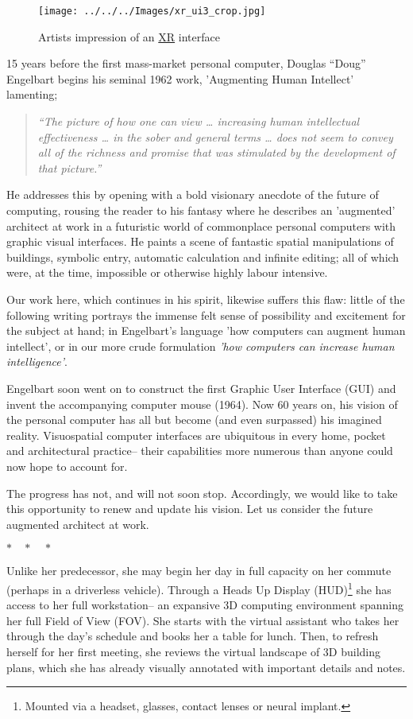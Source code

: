 \documentclass[logo,bsc,singlespacing,parskip]{infthesis}
\newcommand{\threestars}{\begin{center}$ {\ast}\quad{\ast}\quad{\ast} $\end{center}}
\begin{document}
\begin{figure}[h]
\centering
\texttt{[image: ../../../Images/xr\_ui3\_crop.jpg]}
\caption{Artists impression of an \hyperref[org39cbd51]{XR} interface}
\end{figure}

15 years before the first mass-market personal computer, Douglas ``Doug'' Engelbart begins his seminal 1962 work, 'Augmenting Human Intellect' \autocite{engelbartAugmentingHumanIntellect1962} lamenting;

\begin{quote}
\emph{``The picture of how one can view \ldots{} increasing human intellectual effectiveness \ldots{} in the sober and general terms \ldots{} does not seem to convey all of the richness and promise that was stimulated by the development of that picture.''}
\end{quote}

He addresses this by opening with a bold visionary anecdote of the future of computing, rousing the reader to his fantasy where he describes an 'augmented' architect at work in a futuristic world of commonplace personal computers with graphic visual interfaces.
He paints a scene of fantastic spatial manipulations of buildings, symbolic entry, automatic calculation and infinite editing; all of which were, at the time, impossible or otherwise highly labour intensive.

Our work here, which continues in his spirit, likewise suffers this flaw: little of the following writing portrays the immense felt sense of possibility and excitement for the subject at hand; in Engelbart's language 'how computers can augment human intellect', or in our more crude formulation \emph{'how computers can increase human intelligence'}.

Engelbart soon went on to construct the first Graphic User Interface (GUI) and invent the accompanying computer mouse (1964).
Now 60 years on, his vision of the personal computer has all but become (and even surpassed) his imagined reality.
Visuospatial computer interfaces are ubiquitous in every home, pocket and architectural practice-- their capabilities more numerous than anyone could now hope to account for.

The progress has not, and will not soon stop.
Accordingly, we would like to take this opportunity to renew and update his vision.
Let us consider the future augmented architect at work.
\threestars

Unlike her predecessor, she may begin her day in full capacity on her commute (perhaps in a driverless vehicle).
Through a Heads Up Display (HUD)\footnote{Mounted via a headset, glasses, contact lenses or neural implant.} she has access to her full workstation-- an expansive 3D computing environment spanning her full Field of View (FOV).
She starts with the virtual assistant who takes her through the day's schedule and books her a table for lunch.
Then, to refresh herself for her first meeting, she reviews the virtual landscape of 3D building plans, which she has already visually annotated with important details and notes.
\end{document}

